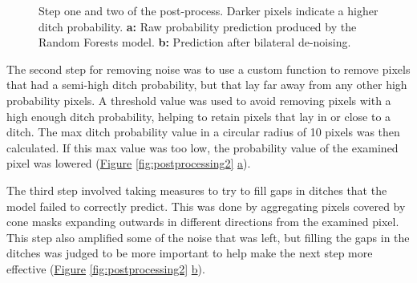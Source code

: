 \documentclass[]{interact}
\theoremstyle{plain}%
\theoremstyle{definition}
\theoremstyle{remark}
\begin{document}
\begin{figure} [!htb]
    \caption{Step one and two of the post-process. Darker pixels indicate a higher ditch probability. \textbf{a: }Raw probability prediction produced by the Random Forests model. \textbf{b: }Prediction after bilateral de-noising.}
    \label{fig:postprocessing1}
\end{figure}

The second step for removing noise was to use a custom function to remove pixels that had a semi-high ditch probability, but that lay far away from any other high probability pixels. A threshold value was used to avoid removing pixels with a high enough ditch probability, helping to retain pixels that lay in or close to a ditch. The max ditch probability value in a circular radius of 10 pixels was then calculated. If this max value was too low, the probability value of the examined pixel was lowered (\hyperref[fig:postprocessing2]{Figure} \ref{fig:postprocessing2} \hyperref[fig:postprocessing2]{a}).

The third step involved taking measures to try to fill gaps in ditches that the model failed to correctly predict. This was done by aggregating pixels covered by cone masks expanding outwards in different directions from the examined pixel. This step also amplified some of the noise that was left, but filling the gaps in the ditches was judged to be more important to help make the next step more effective (\hyperref[fig:postprocessing2]{Figure} \ref{fig:postprocessing2} \hyperref[fig:postprocessing2]{b}).
\end{document}
